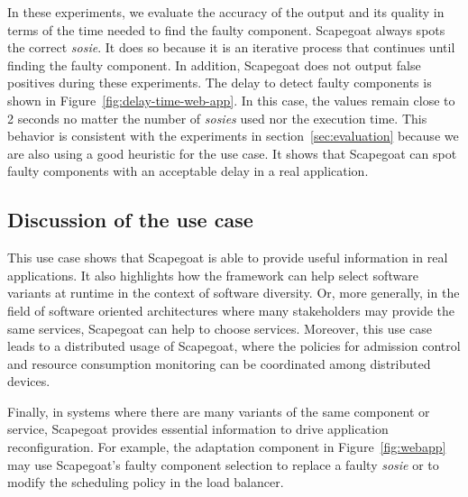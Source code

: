 

In these experiments, we evaluate the accuracy of the output and its quality in terms of the time needed to find the faulty component.
Scapegoat always spots the correct \textit{sosie}.
It does so because it is an iterative process that continues until finding the faulty component.
In addition, Scapegoat does not output false positives during these experiments.
The delay to detect faulty components is shown in Figure~\ref{fig:delay-time-web-app}.
In this case, the values remain close to 2 seconds no matter the number of \textit{sosies} used nor the execution time.
This behavior is consistent with the experiments in section~\ref{sec:evaluation} because we are also using a good heuristic for the use case.
It shows that Scapegoat can spot faulty components with an acceptable delay in a real application.

\subsection{Discussion of the use case}
This use case shows that Scapegoat is able to provide useful information in real applications.
It also highlights how the framework can help select software variants at runtime in the context of software diversity.
Or, more generally, in the field of software oriented architectures where many stakeholders may provide the same services, Scapegoat can help to choose services.
Moreover, this use case leads to a distributed usage of Scapegoat, where the policies for admission control and resource consumption monitoring can be coordinated among distributed devices.

Finally, in systems where there are many variants of the same component or service, Scapegoat provides essential information to drive application reconfiguration.
For example, the adaptation component in Figure~\ref{fig:webapp} may use Scapegoat's faulty component selection to replace a faulty \textit{sosie} or to modify the scheduling policy in the load balancer.




